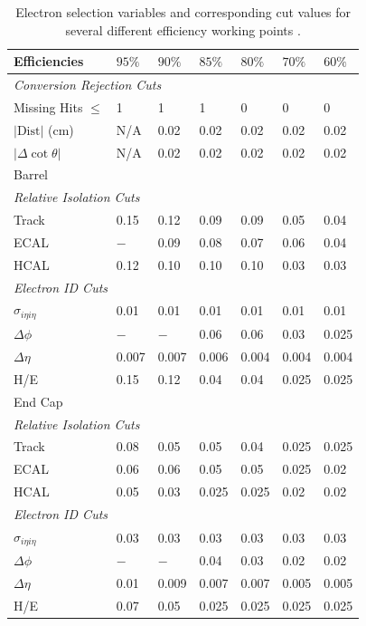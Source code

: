\begin{table}[htbp]
  \begin{center}
    \begin{tabular}{lllllll} 
\toprule
Efficiencies& $95\%$& $90\%$& $85\%$& $80\%$& $70\%$& $60\%$\\
\midrule
\multicolumn{7}{l}{\emph{Conversion Rejection Cuts}}\\ 
Missing Hits $\leq$& 1& 1& 1& 0& 0& 0\\
$\vert \text{Dist} \vert$ (cm) & N/A& 0.02& 0.02& 0.02& 0.02& 0.02\\
$\vert\Delta\cot\theta\vert$& N/A& 0.02& 0.02& 0.02& 0.02& 0.02\\
\midrule
\multicolumn{7}{l}{Barrel}\\ 
\multicolumn{7}{l}{\emph{Relative Isolation Cuts}} \\
Track    & 0.15& 0.12& 0.09& 0.09& 0.05& 0.04\\
ECAL     & $-$ & 0.09& 0.08& 0.07& 0.06& 0.04\\
HCAL     & 0.12& 0.10& 0.10& 0.10& 0.03& 0.03\\
\multicolumn{7}{l}{\emph{Electron ID Cuts}} \\
$\sigma_{i\eta i\eta}$& 0.01& 0.01& 0.01& 0.01& 0.01& 0.01\\
$\Delta \phi$& $-$ & $-$ & 0.06& 0.06& 0.03& 0.025\\
$\Delta \eta$& 0.007& 0.007& 0.006& 0.004& 0.004& 0.004\\
H/E& 0.15& 0.12& 0.04& 0.04& 0.025& 0.025\\
\midrule
\multicolumn{7}{l}{End Cap}\\ 
\multicolumn{7}{l}{\emph{Relative Isolation Cuts}} \\
Track    & 0.08& 0.05& 0.05& 0.04& 0.025& 0.025\\
ECAL     & 0.06& 0.06& 0.05& 0.05& 0.025& 0.02\\
HCAL     & 0.05& 0.03& 0.025& 0.025& 0.02& 0.02\\
\multicolumn{7}{l}{\emph{Electron ID Cuts}} \\
$\sigma_{i\eta i\eta}$& 0.03& 0.03& 0.03& 0.03& 0.03& 0.03\\
$\Delta \phi$& $-$ & $-$ & 0.04& 0.03& 0.02& 0.02\\
$\Delta \eta$& 0.01& 0.009& 0.007& 0.007& 0.005& 0.005\\
H/E& 0.07& 0.05& 0.025& 0.025& 0.025& 0.025\\
\bottomrule
    \end{tabular}
    \caption[Electron selection variables and corresponding cut values for
several different efficiency working points.] {Electron selection variables and
corresponding cut values for several different efficiency working points
\cite{nikos,daskalakis2009data,simplecutbasedeleid}.\label{tab:electronwp} }
  \end{center}
\end{table}

